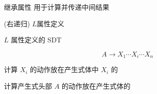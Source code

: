 \begin{frame}{}
  \begin{center}
    继承属性  用于计算并传递中间结果

    \vspace{0.50cm}

    \vspace{0.50cm}
  \end{center}
\end{frame}

\begin{frame}{}
  \begin{center}
    (右递归) $L$属性定义
    \vspace{-0.50cm}
    

    \vspace{0.30cm}

    \pause
    \vspace{0.50cm}
    $L$ 属性定义的 SDT
    \vspace{-0.50cm}
    
  \end{center}
\end{frame}

\begin{frame}{}
  \begin{center}
    

    
  \end{center}
\end{frame}

\begin{frame}{}
  \begin{center}
    

    
  \end{center}
\end{frame}

\begin{frame}{}
  \begin{center}

    \[
      A \to X_{1} \cdots X_{i} \cdots X_{n}
    \]

    \vspace{0.80cm}
    计算 $X_{i}$ 的动作放在产生式体中 $X_{i}$ 的

    \vspace{0.30cm}
    计算产生式头部 $A$ 的动作放在产生式体的
  \end{center}
\end{frame}

